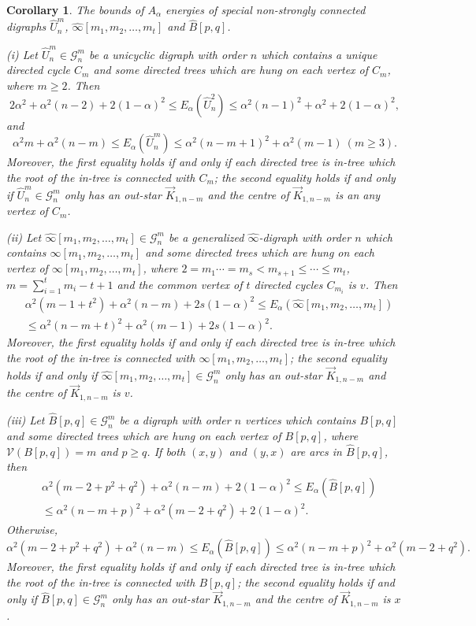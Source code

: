 \documentclass[11pt]{article}
\newtheorem{corollary}[theorem]{Corollary}
\begin{document}
\noindent\begin{corollary}\label{ex:ch-3.10} The bounds of $A_\alpha$ energies of special non-strongly connected digraphs $\widehat{U}_n^{m}$, $\widehat{\infty}[m_1,m_2,\ldots,m_t]$ and $\widehat{B}[p,q]$.

(i) Let $\widehat{U}_n^{m}\in\mathcal{G}_n^m$ be a unicyclic digraph with order $n$ which contains a unique directed cycle $C_m$ and some directed trees which are hung on each vertex of $C_m$, where $m\geq2$. Then
$$2\alpha^2+\alpha^2(n-2)+2(1-\alpha)^2\leq E_\alpha(\widehat{U}_n^{2})\leq\alpha^2(n-1)^2+\alpha^2+2(1-\alpha)^2,$$
and
$$\alpha^2m+\alpha^2(n-m)\leq E_\alpha(\widehat{U}_n^{m})\leq\alpha^2(n-m+1)^2+\alpha^2(m-1)\ (m\geq3).$$
Moreover, the first equality holds if and only if each directed tree is in-tree which the root of the in-tree is connected with $C_m$; the second equality holds if and only if $\widehat{U}_n^{m}\in\mathcal{G}_n^m$ only has an out-star $\stackrel{\rightarrow}{K}_{1,n-m}$ and the centre of $\stackrel{\rightarrow}{K}_{1,n-m}$ is an any vertex of $C_m$.

(ii) Let $\widehat{\infty}[m_1,m_2,\ldots,m_t]\in\mathcal{G}_n^m$ be a generalized $\widehat{\infty}$-digraph with order $n$ which contains $\infty[m_1,m_2,\ldots,m_t]$ and some directed trees which are hung on each vertex of $\infty[m_1,m_2,\ldots,m_t]$, where $2=m_1\cdots=m_s<m_{s+1}\leq\cdots\leq m_t$, $m=\sum_{i=1}^tm_i-t+1$ and the common vertex of  $t$ directed cycles $C_{m_i}$ is $v$. Then
\begin{align*}
&\alpha^2(m-1+t^2)+\alpha^2(n-m)+2s(1-\alpha)^2\leq E_\alpha(\widehat{\infty}[m_1,m_2,\ldots,m_t])\\
&\leq\alpha^2\left(n-m+t\right)^2+\alpha^2(m-1)+2s(1-\alpha)^2.
\end{align*}
Moreover, the first equality holds if and only if each directed tree is in-tree which the root of the in-tree is connected with $\infty[m_1,m_2,\ldots,m_t]$; the second equality holds if and only if $\widehat{\infty}[m_1,m_2,\ldots,m_t]\in\mathcal{G}_n^m$ only has an out-star $\stackrel{\rightarrow}{K}_{1,n-m}$ and the centre of $\stackrel{\rightarrow}{K}_{1,n-m}$ is $v$.

(iii) Let $\widehat{B}[p,q]\in\mathcal{G}_n^m$ be a digraph with order $n$ vertices which contains $B[p,q]$ and some directed trees which are hung on each vertex of $B[p,q]$, where $\mathcal{V}(B[p,q])=m$ and $p\geq q$. If both $(x,y)$ and $(y,x)$ are arcs in $\widehat{B}[p,q]$, then
\begin{align*}
&\alpha^2(m-2+p^2+q^2)+\alpha^2(n-m)+2(1-\alpha)^2\leq E_\alpha(\widehat{B}[p,q])\\
&\leq\alpha^2\left(n-m+p\right)^2+\alpha^2(m-2+q^2)+2(1-\alpha)^2.
\end{align*}
Otherwise,
$$\alpha^2(m-2+p^2+q^2)+\alpha^2(n-m)\leq E_\alpha(\widehat{B}[p,q])\leq\alpha^2\left(n-m+p\right)^2+\alpha^2(m-2+q^2).$$
Moreover, the first equality holds if and only if each directed tree is in-tree which the root of the in-tree is connected with $B[p,q]$; the second equality holds if and only if $\widehat{B}[p,q]\in\mathcal{G}_n^m$ only has an out-star $\stackrel{\rightarrow}{K}_{1,n-m}$ and the centre of $\stackrel{\rightarrow}{K}_{1,n-m}$ is $x$.
\end{corollary}
\end{document}
